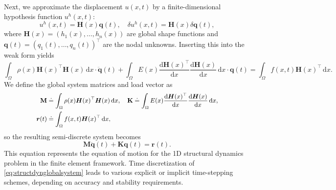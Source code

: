 \documentclass[a4paper,11pt]{article}
\numberwithin{equation}{section}
\newcommand\matr[1]{\ensuremath{\boldsymbol{\mathbf{#1}}}}
\newcommand\vect[1]{\ensuremath{\bm{#1}}}
\begin{document}
{\begin{equation}
\end{equation}
Next, we approximate the displacement $u(x,t)$ by a finite-dimensional hypothesis function $u^h(x,t)$:
\begin{equation}
	u^h(x,t) = \vect{H}(x)\vect{q}(t), \quad \delta u^h(x,t) = \vect{H}(x)\delta\vect{q}(t),
\end{equation}
where $\vect{H}(x) = (h_1(x),\dots,h_n(x))$ are global shape functions and $\vect{q}(t) = (q_1(t),\dots,q_n(t))^\top$ are the nodal unknowns. Inserting this into the weak form yields
\begin{equation}
	\int_\Omega \rho(x) \vect{H}(x)^\top \vect{H}(x)\,\mathrm{d}x \cdot \ddot{\vect{q}}(t) + \int_\Omega E(x)\frac{\mathrm{d}\vect{H}(x)^\top}{\mathrm{d}x} \frac{\mathrm{d}\vect{H}(x)}{\mathrm{d}x} \,\mathrm{d}x \cdot \vect{q}(t) = \int_\Omega f(x,t)\vect{H}(x)^\top\,\mathrm{d}x.
\end{equation}
We define the global system matrices and load vector as
\begin{align}\small\begin{aligned}
		\matr{M} &\doteq \int_\Omega \rho(x)\vect{H}(x)^\top\vect{H}(x)\,\mathrm{d}x, \quad
		\matr{K} \doteq \int_\Omega E(x)\frac{\mathrm{d}\vect{H}(x)^\top}{\mathrm{d}x} \frac{\mathrm{d}\vect{H}(x)}{\mathrm{d}x}\,\mathrm{d}x, \\
		\vect{r}(t) &\doteq \int_\Omega f(x,t)\vect{H}(x)^\top\,\mathrm{d}x,
\end{aligned}\end{align}
so the resulting semi-discrete system becomes
\begin{equation}\label{eq:structdynglobalsystem}
	\matr{M}\ddot{\vect{q}}(t) + \matr{K}\vect{q}(t) = \vect{r}(t).
\end{equation}
This equation represents the equation of motion for the 1D structural dynamics problem in the finite element framework. Time discretization of \cref{eq:structdynglobalsystem} leads to various explicit or implicit time-stepping schemes, depending on accuracy and stability requirements.
}
\end{document}
